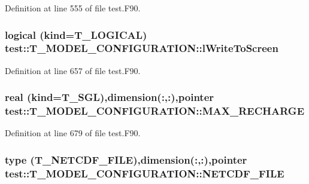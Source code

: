 Definition at line 555 of file test.F90.

\hypertarget{typetest_1_1_t___m_o_d_e_l___c_o_n_f_i_g_u_r_a_t_i_o_n_ad06c7b3ed0928b93d283998b6da8438f}{
\subsubsection[{lWriteToScreen}]{\setlength{\rightskip}{0pt plus 5cm}logical (kind={\bf T\_\-LOGICAL}) {\bf test::T\_\-MODEL\_\-CONFIGURATION::lWriteToScreen}}}
\label{typetest_1_1_t___m_o_d_e_l___c_o_n_f_i_g_u_r_a_t_i_o_n_ad06c7b3ed0928b93d283998b6da8438f}


Definition at line 657 of file test.F90.

\hypertarget{typetest_1_1_t___m_o_d_e_l___c_o_n_f_i_g_u_r_a_t_i_o_n_ad9308a9326e064d5966e101eac4b3fd7}{
\subsubsection[{MAX\_\-RECHARGE}]{\setlength{\rightskip}{0pt plus 5cm}real (kind={\bf T\_\-SGL}),dimension(:,:),pointer {\bf test::T\_\-MODEL\_\-CONFIGURATION::MAX\_\-RECHARGE}}}
\label{typetest_1_1_t___m_o_d_e_l___c_o_n_f_i_g_u_r_a_t_i_o_n_ad9308a9326e064d5966e101eac4b3fd7}


Definition at line 679 of file test.F90.

\hypertarget{typetest_1_1_t___m_o_d_e_l___c_o_n_f_i_g_u_r_a_t_i_o_n_a1f2ecbb4c9e4c54f19997f3c1330b6e2}{
\subsubsection[{NETCDF\_\-FILE}]{\setlength{\rightskip}{0pt plus 5cm}type ({\bf T\_\-NETCDF\_\-FILE}),dimension(:,:),pointer {\bf test::T\_\-MODEL\_\-CONFIGURATION::NETCDF\_\-FILE}}}
\label{typetest_1_1_t___m_o_d_e_l___c_o_n_f_i_g_u_r_a_t_i_o_n_a1f2ecbb4c9e4c54f19997f3c1330b6e2}



